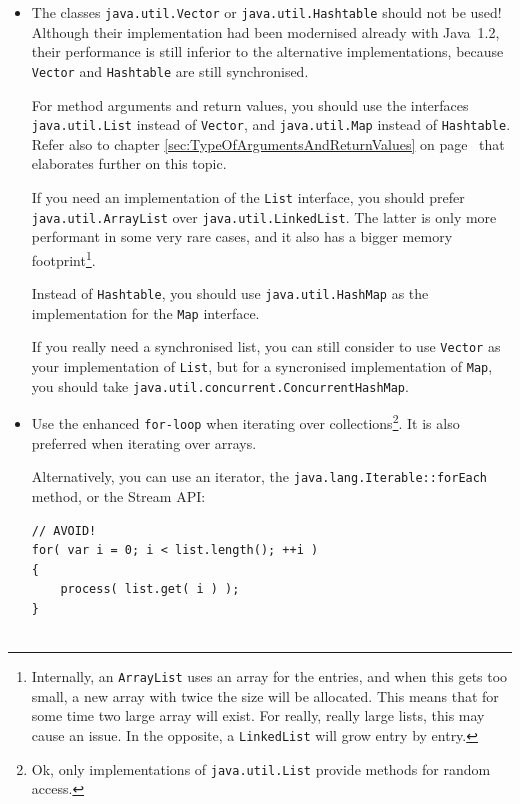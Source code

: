 \documentclass[11pt,a4paper, titlepage, parskip=half, headsepline, footsepline, cleardoublepage=current, headheight=1cm]{scrbook}
\newcommand*{\tqvref}[1]{\hyperref[{#1}]{\ref*{#1}} on page~\pageref{#1}}
\begin{document}
\begin{itemize}
\item{The classes \lstinline|java.util.Vector|\autocite{ORACLE_DOC_VECTOR_CLASS} or \lstinline|java.util.Hashtable|\autocite{ORACLE_DOC_HASHTABLE_CLASS} should not be used! Although their implementation had been modernised already with Java~1.2, their performance is still inferior to the alternative implementations, because \lstinline|Vector| and \lstinline|Hashtable| are still synchronised.

For method arguments and return values, you should use the interfaces \lstinline|java.util.List|\autocite{ORACLE_DOC_LIST_INTERFACE} instead of \lstinline|Vector|, and \lstinline|java.util.Map|\autocite{ORACLE_DOC_MAP_INTERFACE} instead of \lstinline|Hashtable|. Refer also to chapter \tqvref{sec:TypeOfArgumentsAndReturnValues} that elaborates further on this topic.

If you need an implementation of the \lstinline|List| interface, you should prefer \lstinline|java.util.ArrayList|\autocite{ORACLE_DOC_ARRAYLIST_CLASS} over \lstinline|java.util.LinkedList|\autocite{ORACLE_DOC_LINKEDLIST_CLASS}. The latter is only more performant in some very rare cases, and it also has a bigger memory footprint\footnote{Internally, an \lstinline|ArrayList| uses an array for the entries, and when this gets too small, a new array with twice the size will be allocated. This means that for some time two large array will exist. For really, really large lists, this may cause an issue. In the opposite, a \lstinline|LinkedList| will grow entry by entry.}.

Instead of \lstinline|Hashtable|, you should use \lstinline|java.util.HashMap|\autocite{ORACLE_DOC_HASHMAP_CLASS} as the implementation for the \lstinline|Map| interface.

If you really need a synchronised list, you can still consider to use \lstinline|Vector| as your implementation of \lstinline|List|, but for a syncronised implementation of \lstinline|Map|, you should take \lstinline|java.util.concurrent.ConcurrentHashMap|\autocite{ORACLE_DOC_CONCURRENTHASHMAP_CLASS}.}

\item{Use the enhanced \lstinline|for-loop| when iterating over collections\footnote{Ok, only implementations of \lstinline|java.util.List|\autocite{ORACLE_DOC_LIST_INTERFACE} provide methods for random access.}. It is also preferred when iterating over arrays.

Alternatively, you can use an iterator, the \lstinline|java.lang.Iterable::forEach| method, or the Stream API:
\begin{lstlisting}
// AVOID!
for( var i = 0; i < list.length(); ++i )
{
    process( list.get( i ) );
}


\end{lstlisting}}
\end{itemize}
\end{document}
